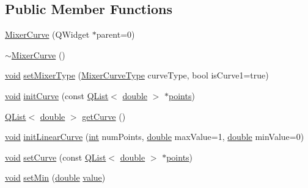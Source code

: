 \subsection*{Public Member Functions}
\begin{DoxyCompactItemize}
\item 
\hyperlink{group___config_plugin_ga1124f8bbbfadf0a60fe37c681a323689}{Mixer\-Curve} (Q\-Widget $\ast$parent=0)
\item 
\hyperlink{group___config_plugin_ga1ecc6d88c82c0c4403185f1741bd096c}{$\sim$\-Mixer\-Curve} ()
\item 
\hyperlink{group___u_a_v_objects_plugin_ga444cf2ff3f0ecbe028adce838d373f5c}{void} \hyperlink{group___config_plugin_ga9fbf13c7b139059e1c3b8788a937b817}{set\-Mixer\-Type} (\hyperlink{group___config_plugin_ga58a5506035df5fabbf4feffb36632595}{Mixer\-Curve\-Type} curve\-Type, bool is\-Curve1=true)
\item 
\hyperlink{group___u_a_v_objects_plugin_ga444cf2ff3f0ecbe028adce838d373f5c}{void} \hyperlink{group___config_plugin_ga2c2f4469e3a93a1aa88633e97073ffa1}{init\-Curve} (const \hyperlink{class_q_list}{Q\-List}$<$ \hyperlink{_super_l_u_support_8h_a8956b2b9f49bf918deed98379d159ca7}{double} $>$ $\ast$\hyperlink{glext_8h_ae75d9f560170dfeaadc8718c87f5fbec}{points})
\item 
\hyperlink{class_q_list}{Q\-List}$<$ \hyperlink{_super_l_u_support_8h_a8956b2b9f49bf918deed98379d159ca7}{double} $>$ \hyperlink{group___config_plugin_ga676b2baa08ec2deceb84e56ceddd9c6c}{get\-Curve} ()
\item 
\hyperlink{group___u_a_v_objects_plugin_ga444cf2ff3f0ecbe028adce838d373f5c}{void} \hyperlink{group___config_plugin_ga149a9a0d28a983db45a48ed71c35f21d}{init\-Linear\-Curve} (\hyperlink{ioapi_8h_a787fa3cf048117ba7123753c1e74fcd6}{int} num\-Points, \hyperlink{_super_l_u_support_8h_a8956b2b9f49bf918deed98379d159ca7}{double} max\-Value=1, \hyperlink{_super_l_u_support_8h_a8956b2b9f49bf918deed98379d159ca7}{double} min\-Value=0)
\item 
\hyperlink{group___u_a_v_objects_plugin_ga444cf2ff3f0ecbe028adce838d373f5c}{void} \hyperlink{group___config_plugin_ga0292ee7413de63e428fd0ca9ec2d0f08}{set\-Curve} (const \hyperlink{class_q_list}{Q\-List}$<$ \hyperlink{_super_l_u_support_8h_a8956b2b9f49bf918deed98379d159ca7}{double} $>$ $\ast$\hyperlink{glext_8h_ae75d9f560170dfeaadc8718c87f5fbec}{points})
\item 
\hyperlink{group___u_a_v_objects_plugin_ga444cf2ff3f0ecbe028adce838d373f5c}{void} \hyperlink{group___config_plugin_gae709bb34fd5b4386c7538059fd77e523}{set\-Min} (\hyperlink{_super_l_u_support_8h_a8956b2b9f49bf918deed98379d159ca7}{double} \hyperlink{glext_8h_aa0e2e9cea7f208d28acda0480144beb0}{value})

\end{DoxyCompactItemize}
